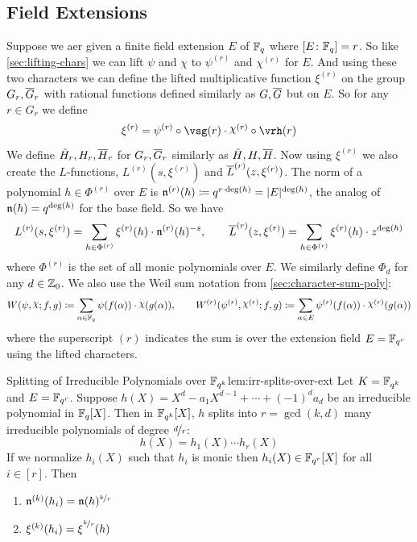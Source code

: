 \subsection{Field Extensions}
Suppose we aer given a finite field extension $E$ of $\mathbb{F}_q$ where $[E\colon \mathbb{F}_q]=r$. So like \autoref{sec:lifting-chars} we can lift $\psi$ and $\chi$ to $\psi^{(r)}$ and $\chi^{(r)}$ for $E$. And using these two characters we can define the lifted multiplicative function $\xi^{(r)}$ on the group $G_r,\overline{G}_r$ with rational functions defined similarly as $G,\overline{G}$ but on $E$. So for any $r\in G_r$ we define $$\xi^{(r)}=\psi^{(r)}\circ \vsg(r)\cdot \chi^{(r)}\circ\vrh(r)$$We define $\tilde{H}_r,H_r,\overline{H}_r$ for $G_r,\overline{G}_r$ similarly as $\tilde{H},H,\overline{H}$. Now using $\xi^{(r)}$ we also create the $L$-functions, $L^{(r)}(s,\xi^{(r)})$ and $\overline{L}^{(r)}(z,\xi^{(r)})$. The norm of a polynomial $h\in\Phi^{(r)}$ over $E$ is $\mathfrak{n}^{(r)}(h)\coloneqq q^{r\cdot\deg(h)}=|E|^{\deg(h)}$, the analog of $\mathfrak{n}(h)=q^{\deg(h)}$ for the base field. So we have $$L^{(r)}(s,\xi^{(r)})=\sum_{h\in\Phi^{(r)}}\xi^{(r)}(h)\cdot\mathfrak{n}^{(r)}(h)^{-s},\qquad \overline{L}^{(r)}(z,\xi^{(r)})=\sum_{h\in\Phi^{(r)}}\xi^{(r)}(h)\cdot z^{\deg(h)}$$ where $\Phi^{(r)}$ is the set of all monic polynomials over $E$. We similarly define $\Phi_d$ for any $d\in\mathbb{Z}_0$. We also use the Weil sum notation from \autoref{sec:character-sum-poly}: $$W(\psi,\chi;f,g)\coloneqq\sum_{\alpha\in\bbF_q}\psi(f(\alpha))\cdot \chi(g(\alpha)),\qquad W^{(r)}(\psi^{(r)},\chi^{(r)};f,g)\coloneqq\sum_{\alpha\in E}\psi^{(r)}(f(\alpha))\cdot\chi^{(r)}(g(\alpha))$$where the superscript $(r)$ indicates the sum is over the extension field $E=\mathbb{F}_{q^r}$ using the lifted characters.
\begin{lemma}{Splitting of Irreducible Polynomials over $\mathbb{F}_{q^k}$}{lem:irr-splits-over-ext}
  Let $K=\mathbb{F}_{q^k}$ and $E=\mathbb{F}_{q^r}$. Suppose $h(X)=X^d-a_1X^{d-1}+\cdots+(-1)^da_d$ be an irreducible polynomial in $\mathbb{F}_q[X]$. Then in $\mathbb{F}_{q^k}[X]$, $h$ splits into $r=\gcd(k,d)$ many irreducible polynomials of degree $\nicefrac{d}{r}$: $$h(X)=h_1(X)\cdots h_r(X)$$If we normalize $h_i(X)$ such that $h_i$ is monic then $h_i(X)\in\mathbb{F}_{q^r}[X]$ for all $i\in[r]$. Then
  \begin{enumerate}[label=(\roman*)]
    \item $\mathfrak{n}^{(k)}(h_i)=\mathfrak{n}(h)^{\nicefrac{k}{r}}$
    \item $\xi^{(k)}(h_i)=\xi\strut^{\nicefrac{k}r}(h)$
  \end{enumerate}
\end{lemma}
